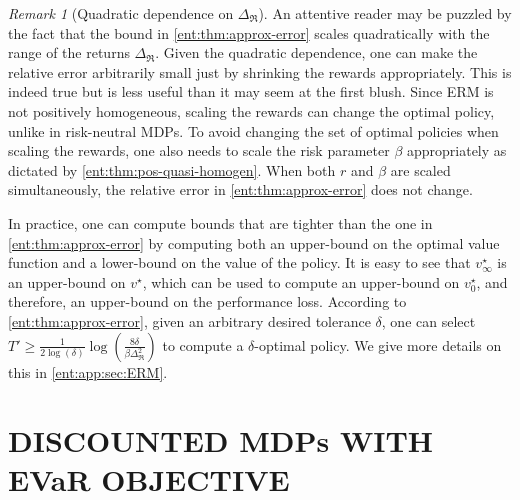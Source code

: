 \documentclass[twoside]{article}
\newcommand{\opt}{^\star}
\theoremstyle{plain}
\theoremstyle{definition}
\theoremstyle{remark}
\newtheorem{remark}{Remark}
\begin{document}
\begin{remark}[Quadratic dependence on $\Delta_\mathfrak{R}$]
An attentive reader may be puzzled by the fact that the bound in \cref{ent:thm:approx-error} scales quadratically with the range of the returns $\Delta_\mathfrak{R}$. Given the quadratic dependence, one can make the relative error arbitrarily small just by shrinking the rewards appropriately. This is indeed true but is less useful than it may seem at the first blush. Since ERM is not positively homogeneous, scaling the rewards can change the optimal policy, unlike in risk-neutral MDPs. To avoid changing the set of optimal policies when scaling the rewards, one also needs to scale the risk parameter $\beta$ appropriately as dictated by \cref{ent:thm:pos-quasi-homogen}. When both $r$ and $\beta$ are scaled simultaneously, the relative error in \cref{ent:thm:approx-error} does not change.
\end{remark}

In practice, one can compute bounds that are tighter than the one in \cref{ent:thm:approx-error} by computing both an upper-bound on the optimal value function and a lower-bound on the value of the policy. It is easy to see that $v_{\infty }\opt$ is an upper-bound on $v\opt$, which can be used to compute an upper-bound on $v_0\opt$, and therefore, an upper-bound on the performance loss. According to \cref{ent:thm:approx-error}, given an arbitrary desired tolerance $\delta$, one can select $T' \geq \frac{1}{2\log(\delta)} \log(\frac{8 \delta}{\beta \Delta_\mathfrak{R}^2})$ to compute a $\delta$-optimal policy. We give more details on this in \cref{ent:app:sec:ERM}. 



\section{DISCOUNTED MDPs WITH EVaR OBJECTIVE}
\label{ent:sec:rasr-evar}
\end{document}
